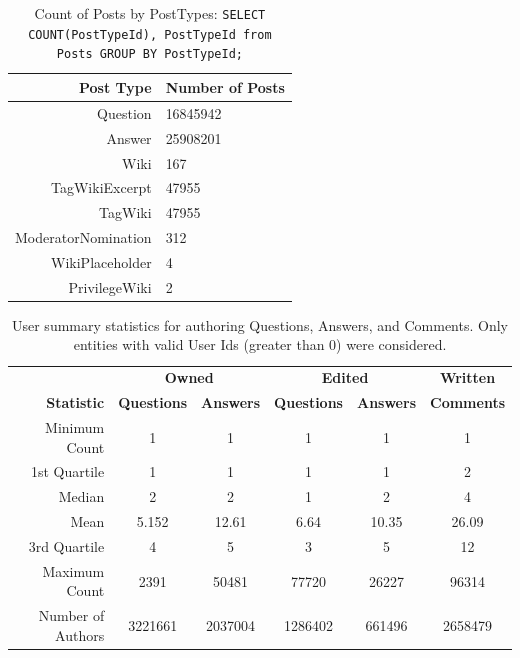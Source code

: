 \documentclass[a4paper,11pt, notitlepage]{report}
\theoremstyle{definition}
\numberwithin{equation}{section}		%
\begin{document}
\begin{table}[ht]
\centering
\begin{tabular}{rl}
\hline
\textbf{Post Type}      & \textbf{Number of Posts}  \\ \hline
Question            & 16845942  \\
Answer              & 25908201  \\
Wiki                & 167       \\
TagWikiExcerpt      & 47955     \\
TagWiki             & 47955     \\
ModeratorNomination & 312       \\
WikiPlaceholder     & 4         \\
PrivilegeWiki       & 2         \\
\end{tabular}
\caption{Count of Posts by PostTypes: \texttt{SELECT COUNT(PostTypeId), PostTypeId from Posts GROUP BY PostTypeId;}}
\label{post-type-counts}
\end{table}

\begin{table}[ht]
\centering
\begin{tabular}{r|cc|cc|c}
\hline
& \multicolumn{2}{c}{\textbf{Owned}} & \multicolumn{2}{c}{\textbf{Edited}} & \textbf{Written} \\
\textbf{Statistic} & \textbf{Questions} & \textbf{Answers} & \textbf{Questions} & \textbf{Answers} & \textbf{Comments} \\ \hline
Minimum Count       & 1     & 1     & 1     & 1     & 1     \\
1st Quartile        & 1     & 1     & 1     & 1     & 2     \\
Median              & 2     & 2     & 1     & 2     & 4     \\
Mean                & 5.152 & 12.61 & 6.64  & 10.35 & 26.09 \\
3rd Quartile        & 4     & 5     & 3     & 5     & 12    \\
Maximum Count       & 2391  & 50481 & 77720 & 26227 & 96314 \\ \hline
Number of Authors   & 3221661 & 2037004 & 1286402 & 661496 & 2658479 \\
\end{tabular}
\caption{User summary statistics for authoring Questions, Answers, and Comments. Only entities with valid User Ids (greater than 0) were considered.}
\label{table:author-to-num-entities}
\end{table}
\end{document}

